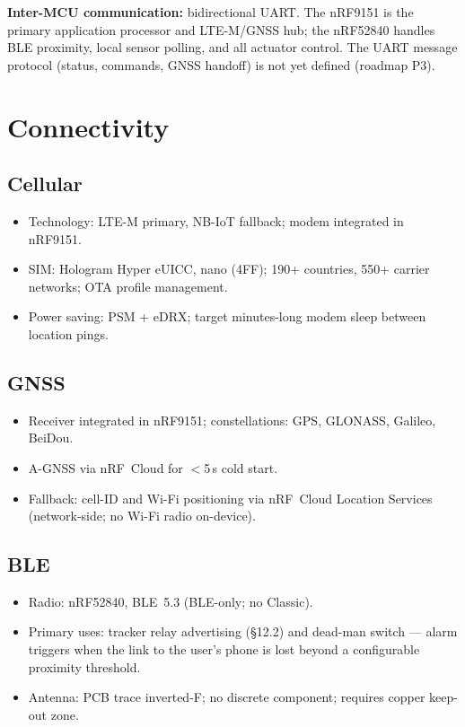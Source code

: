 \documentclass[11pt,a4paper]{article}
\begin{document}
\textbf{Inter-MCU communication:} bidirectional UART. The nRF9151 is the primary application processor and LTE-M/GNSS hub; the nRF52840 handles BLE proximity, local sensor polling, and all actuator control. The UART message protocol (status, commands, GNSS handoff) is not yet defined (roadmap P3).

\section{Connectivity}

\subsection{Cellular}
\begin{itemize}
  \item Technology: LTE-M primary, NB-IoT fallback; modem integrated in nRF9151.
  \item SIM: Hologram Hyper eUICC, nano (4FF); 190+ countries, 550+ carrier networks; OTA profile management.
  \item Power saving: PSM + eDRX; target minutes-long modem sleep between location pings.
\end{itemize}

\subsection{GNSS}
\begin{itemize}
  \item Receiver integrated in nRF9151; constellations: GPS, GLONASS, Galileo, BeiDou.
  \item A-GNSS via nRF~Cloud for $<$5\,s cold start.
  \item Fallback: cell-ID and Wi-Fi positioning via nRF~Cloud Location Services (network-side; no Wi-Fi radio on-device).
\end{itemize}

\subsection{BLE}
\begin{itemize}
  \item Radio: nRF52840, BLE~5.3 (BLE-only; no Classic).
  \item Primary uses: tracker relay advertising (\S12.2) and dead-man switch --- alarm triggers when the link to the user's phone is lost beyond a configurable proximity threshold.
  \item Antenna: PCB trace inverted-F; no discrete component; requires copper keep-out zone.
\end{itemize}
\end{document}
